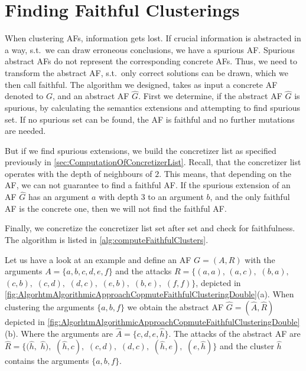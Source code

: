 \newpage

\section{Finding Faithful Clusterings}
\label{sec:AlgorithmicApproachToComputeFaifthulClusterings}
When clustering AFs, information gets lost. If crucial information is abstracted in a way, s.t.\ we can draw erroneous conclusions, we have a spurious AF. Spurious abstract AFs do not represent the corresponding concrete AFs. Thus, we need to transform the abstract AF, s.t.\ only correct solutions can be drawn, which we then call faithful. The algorithm we designed, takes as input a concrete AF denoted to $G$, and an abstract AF $\hat{G}$. First we determine, if the abstract AF $\hat{G}$ is spurious, by calculating the semantics extensions and attempting to find spurious set. If no spurious set can be found, the AF is faithful and no further mutations are needed.

But if we find spurious extensions, we build the concretizer list as specified previously in \cref{sec:ComputationOfConcretizerList}. Recall, that the concretizer list operates with the depth of neighbours of $2$. This means, that depending on the AF, we can not guarantee to find a faithful AF. If the spurious extension of an AF $\hat{G}$ has an argument $a$ with depth 3 to an argument $b$, and the only faithful AF is the concrete one, then we will not find the faithful AF.

Finally, we concretize the concretizer list set after set and check for faithfulness. The algorithm is listed in \cref{alg:computeFaithfulClusters}.



\begin{example}
    Let us have a look at an example and define an AF $G=(A,R)$ with the arguments $A=\{a, b, c, d, e, f\}$ and the attacks $R=\bigl\{(a, a)$, $(a, c),$ $(b, a),$ $(c, b),$ $(c, d),$ $(d, c),$ $(e, b),$ $(b, e),$ $(f, f)\bigl\}$, depicted in \cref{fig:AlgorhtmAlgorithmicApproachCopmuteFaithfulClusteringDouble}(a). When clustering the arguments $\{a, b, f\}$ we obtain the abstract AF $\hat{G}=(\hat{A}, \hat{R})$ depicted in \cref{fig:AlgorhtmAlgorithmicApproachCopmuteFaithfulClusteringDouble}(b). Where the arguments are $\hat{A}=\{c, d, e, \hat{h}\}$. The attacks of the abstract AF are $\hat{R}=\{(\hat{h},$ $\hat{h}),$ $(\hat{h}, c),$ $(c, d),$ $(d, c),$ $(\hat{h}, e),$ $(e, \hat{h})\}$ and the cluster $\hat{h}$ contains the arguments $\{a, b, f\}$.
\end{example}


